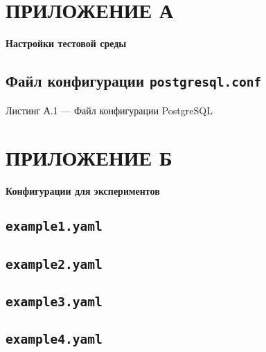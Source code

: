 \clearpage
{}


\section*{ПРИЛОЖЕНИЕ А}
\begin{center}
\textbf{Настройки тестовой среды}
\end{center}

\subsection*{Файл конфигурации \texttt{postgresql.conf}}
\label{app:postgresql_conf}
Листинг А.1 — Файл конфигурации PostgreSQL


\clearpage
{}
\section*{ПРИЛОЖЕНИЕ Б}

\begin{center}
\textbf{Конфигурации для экспериментов}
\end{center}

\subsection*{\texttt{example1.yaml}}
\label{app:example1}


\subsection*{\texttt{example2.yaml}}
\label{app:example2}


\subsection*{\texttt{example3.yaml}}
\label{app:example3}


\subsection*{\texttt{example4.yaml}}
\label{app:example4}

